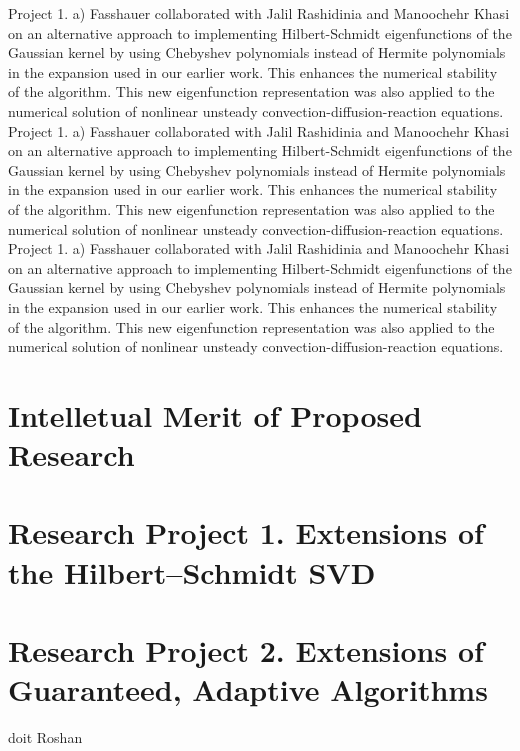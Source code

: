 \documentclass[11pt]{NSFamsart}
\begin{document}
Project 1. 
a) Fasshauer collaborated with Jalil Rashidinia and Manoochehr Khasi on an alternative 
approach to implementing Hilbert-Schmidt eigenfunctions of the Gaussian kernel by using 
Chebyshev polynomials instead of Hermite polynomials in the expansion used in our earlier 
work. This enhances the numerical stability of the algorithm. This new eigenfunction 
representation was also applied to the numerical solution of nonlinear unsteady 
convection-diffusion-reaction equations.
Project 1. 
a) Fasshauer collaborated with Jalil Rashidinia and Manoochehr Khasi on an alternative 
approach to implementing Hilbert-Schmidt eigenfunctions of the Gaussian kernel by using 
Chebyshev polynomials instead of Hermite polynomials in the expansion used in our earlier 
work. This enhances the numerical stability of the algorithm. This new eigenfunction 
representation was also applied to the numerical solution of nonlinear unsteady 
convection-diffusion-reaction equations.
Project 1. 
a) Fasshauer collaborated with Jalil Rashidinia and Manoochehr Khasi on an alternative 
approach to implementing Hilbert-Schmidt eigenfunctions of the Gaussian kernel by using 
Chebyshev polynomials instead of Hermite polynomials in the expansion used in our earlier 
work. This enhances the numerical stability of the algorithm. This new eigenfunction 
representation was also applied to the numerical solution of nonlinear unsteady 
convection-diffusion-reaction equations.




\section{Intelletual Merit of Proposed Research} \label{secProposed}


\section*{Research Project 1. Extensions of the Hilbert--Schmidt SVD}\label{SectHSSVD}



\section*{Research Project 2. Extensions of Guaranteed, Adaptive Algorithms}\label{SectGAIL}

doit Roshan
\end{document}
